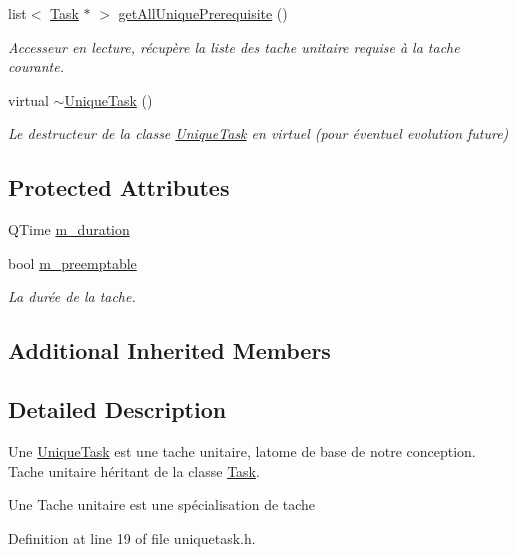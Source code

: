 \begin{DoxyCompactItemize}
list$<$ \hyperlink{class_task}{Task} $\ast$ $>$ \hyperlink{class_unique_task_a67587bbb2a9522443c86639e1416e73e}{get\+All\+Unique\+Prerequisite} ()
\begin{DoxyCompactList}\small\item\em Accesseur en lecture, récupère la liste des tache unitaire requise à la tache courante. \end{DoxyCompactList}\item 
virtual \hyperlink{class_unique_task_a69b07051dcfbf6d2225ae9938fc5087b}{$\sim$\+Unique\+Task} ()
\begin{DoxyCompactList}\small\item\em Le destructeur de la classe \hyperlink{class_unique_task}{Unique\+Task} en virtuel (pour éventuel evolution future) \end{DoxyCompactList}\end{DoxyCompactItemize}
\subsection*{Protected Attributes}
\begin{DoxyCompactItemize}
\item 
Q\+Time \hyperlink{class_unique_task_a8d7fa1559a22ca019cc353354f5e7094}{m\+\_\+duration}
\item 
bool \hyperlink{class_unique_task_a93fcfbd1a38642296ca7ac7919129bf4}{m\+\_\+preemptable}
\begin{DoxyCompactList}\small\item\em La durée de la tache. \end{DoxyCompactList}\end{DoxyCompactItemize}
\subsection*{Additional Inherited Members}


\subsection{Detailed Description}
Une \hyperlink{class_unique_task}{Unique\+Task} est une tache unitaire, l\textquotesingle{}atome de base de notre conception. Tache unitaire héritant de la classe \hyperlink{class_task}{Task}. 

Une Tache unitaire est une spécialisation de tache 

Definition at line 19 of file uniquetask.\+h.




